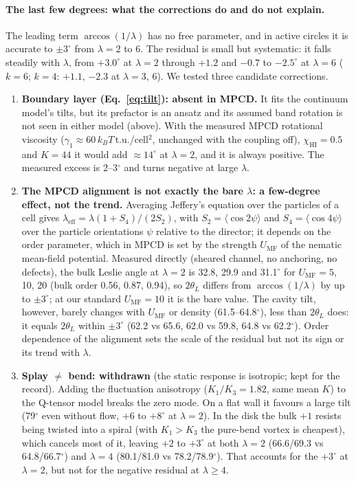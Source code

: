 \documentclass[11pt,a4paper]{article}
\newcommand{\kT}{k_BT}
\begin{document}
\paragraph{The last few degrees: what the corrections do and do not explain.} The leading term $\arccos(1/\lambda)$ has no free parameter, and in active circles it is
accurate to $\pm3^\circ$ from $\lambda=2$ to 6. The residual is small but systematic: it falls steadily with $\lambda$, from $+3.0^\circ$ at $\lambda=2$ through $+1.2$ and $-0.7$ to
$-2.5^\circ$ at $\lambda=6$ ($k=6$; $k=4$: $+1.1$, $-2.3$ at $\lambda=3$, 6). We tested three candidate corrections.
\begin{enumerate}
  \item \textbf{Boundary layer (Eq.~\ref{eq:tilt}): absent in MPCD.} It fits the continuum model's tilts, but its prefactor is an ansatz and its assumed band rotation is not seen
        in either model (above). With the measured MPCD rotational viscosity ($\gamma_1\approx60\,\kT$\,t.u./cell$^2$, unchanged with the coupling off), $\chi_\mathrm{HI}=0.5$ and $K=44$ it
        would add $\approx14^\circ$ at $\lambda=2$, and it is always positive. The measured excess is 2--3$^\circ$ and turns negative at large $\lambda$.
  \item \textbf{The MPCD alignment is not exactly the bare $\lambda$: a few-degree effect, not the trend.} Averaging Jeffery's equation over the particles of a cell gives
        $\lambda_\mathrm{eff}=\lambda(1+S_4)/(2S_2)$, with $S_2=\langle\cos2\psi\rangle$ and $S_4=\langle\cos4\psi\rangle$ over the particle orientations $\psi$ relative to the director;
        it depends on the order parameter, which in MPCD is set by the strength $U_\mathrm{MF}$ of the nematic mean-field potential. Measured directly (sheared channel, no anchoring, no defects), the bulk Leslie angle at
        $\lambda=2$ is 32.8, 29.9 and 31.1$^\circ$ for $U_\mathrm{MF}=5$, 10, 20 (bulk order 0.56, 0.87, 0.94), so $2\theta_L$ differs from $\arccos(1/\lambda)$ by up to $\pm3^\circ$; at our standard
        $U_\mathrm{MF}=10$ it is the bare value. The cavity tilt, however, barely changes with $U_\mathrm{MF}$ or density (61.5--64.8$^\circ$), less than $2\theta_L$ does: it equals $2\theta_L$ within $\pm3^\circ$
        (62.2 vs 65.6, 62.0 vs 59.8, 64.8 vs 62.2$^\circ$). Order dependence of the alignment sets the scale of the residual but not its sign or its trend with $\lambda$.
  \item \textbf{Splay $\neq$ bend: withdrawn} (the static response is isotropic; kept for the record). Adding the fluctuation anisotropy ($K_1/K_3=1.82$, same mean $K$) to the Q-tensor model breaks
        the zero mode. On a flat wall it favours a large tilt (79$^\circ$ even without flow, $+6$ to $+8^\circ$ at $\lambda=2$). In the disk the bulk $+1$ resists being twisted into a spiral
        (with $K_1>K_3$ the pure-bend vortex is cheapest), which cancels most of it, leaving $+2$ to $+3^\circ$ at both $\lambda=2$ (66.6/69.3 vs 64.8/66.7$^\circ$) and $\lambda=4$
        (80.1/81.0 vs 78.2/78.9$^\circ$). That accounts for the $+3^\circ$ at $\lambda=2$, but not for the negative residual at $\lambda\ge4$.
\end{enumerate}
\end{document}
